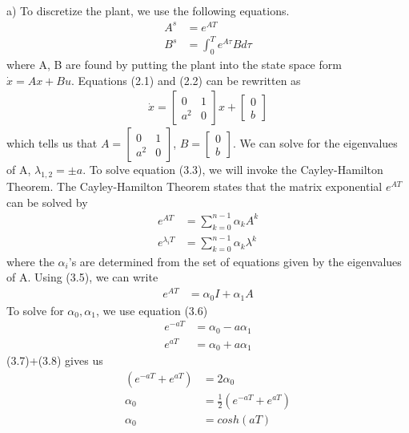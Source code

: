 \documentclass{article}
\begin{document}
  a) To discretize the plant, we use the following equations.
  \begin{align*}
	  A^s&=e^{AT} \tag{3.3} \\
	  B^s&=\int_0^Te^{A\tau}Bd\tau \tag{3.4}
  \end{align*}
  where A, B are found by putting the plant into the state space form $\dot{x}=Ax+Bu$.
  Equations (2.1) and (2.2) can be rewritten as 
  \begin{align*}
	  \dot{x}=
	  \begin{bmatrix}
		  0 & 1 \\
		  a^2 & 0
	  \end{bmatrix}x + 
	  \begin{bmatrix}
		  0 \\
		  b 
	  \end{bmatrix}
  \end{align*}
  which tells us that $A=
  \begin{bmatrix}
	  0 & 1 \\
	  a^2 & 0
  \end{bmatrix}$, $B=
  \begin{bmatrix}
         0 \\
         b 
  \end{bmatrix}$.
  We can solve for the eigenvalues of A, $\lambda_{1,2}=\pm a$. \newline
  To solve equation (3.3), we will invoke the Cayley-Hamilton Theorem. The Cayley-Hamilton Theorem states that the matrix exponential $e^{AT}$ can be solved by 
  \begin{align*}
	  e^{AT}&=\sum_{k=0}^{n-1}\alpha_kA^k \tag{3.5} \\
	  e^{\lambda_iT}&=\sum_{k=0}^{n-1}\alpha_k\lambda^k \tag{3.6}
  \end{align*}
  where the $\alpha_i$’s are determined from the set of equations given by the eigenvalues of A. \newline
  Using (3.5), we can write 
  \begin{align*}
	  e^{AT}&=\alpha_0I+\alpha_1A
  \end{align*}
  To solve for $\alpha_0, \alpha_1$, we use equation (3.6)
  \begin{align*}
	  e^{-aT}&=\alpha_0-a\alpha_1 \tag{3.7} \\
	  e^{aT}&=\alpha_0+a\alpha_1 \tag{3.8} 
  \end{align*}
  (3.7)+(3.8) gives us 
  \begin{align*}
	  (e^{-aT}+e^{aT})&=2\alpha_0 \\
	  \alpha_0&=\frac{1}{2}(e^{-aT}+e^{aT}) \\
	  \alpha_0&=cosh(aT) \tag{3.9}
  \end{align*}
\end{document}
